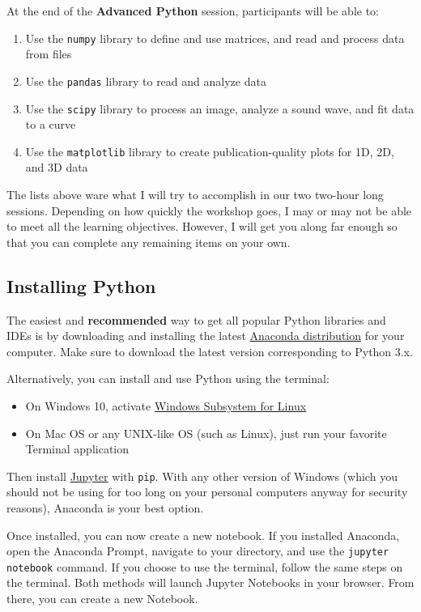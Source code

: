 \documentclass[12pt]{article}
\newcommand{\code}{\texttt}
\begin{document}
At the end of the \textbf{Advanced Python} session, participants will be able to:

\begin{enumerate}
	\item Use the \code{numpy} library to define and use matrices, and read and process data from files
	\item Use the \code{pandas} library to read and analyze data
	\item Use the \code{scipy} library to process an image, analyze a sound wave, and fit data to a curve
	\item Use the \code{matplotlib} library to create publication-quality plots for 1D, 2D, and 3D data
\end{enumerate}

The lists above ware what I will try to accomplish in our two two-hour long sessions. Depending on how quickly the workshop goes, I may or may not be able to meet all the learning objectives. However, I will get you along far enough so that you can complete any remaining items on your own.

\subsection{Installing Python}
The easiest and \textbf{recommended} way to get all popular Python libraries and IDEs is by downloading and installing the latest \href{https://www.anaconda.com/distribution/}{Anaconda distribution} for your computer. Make sure to download the latest version corresponding to Python 3.x.

Alternatively, you can install and use Python using the terminal: 

\begin{itemize}
	\item On Windows 10, activate \href{https://docs.microsoft.com/en-us/windows/wsl/install-win10}{Windows Subsystem for Linux}
	\item On Mac OS or any UNIX-like OS (such as Linux), just run your favorite Terminal application
\end{itemize}

Then install \href{https://jupyter.org/install}{Jupyter} with \code{pip}. With any other version of Windows (which you should not be using for too long on your personal computers anyway for security reasons), Anaconda is your best option.

Once installed, you can now create a new notebook. If you installed Anaconda, open the Anaconda Prompt, navigate to your directory, and use the \code{jupyter notebook} command. If you choose to use the terminal, follow the same steps on the terminal. Both methods will launch Jupyter Notebooks in your browser. From there, you can create a new Notebook.
\end{document}
